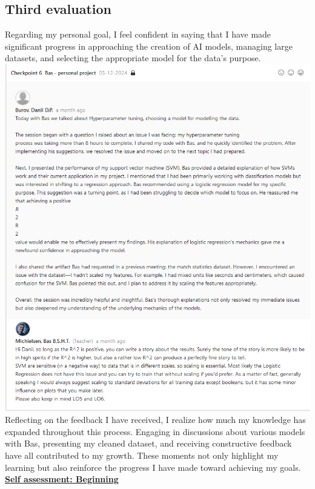 \documentclass{article}
\begin{document}
\subsection{Third evaluation}
Regarding my personal goal, I feel confident in saying that I have made significant progress in approaching the creation of AI models, managing large datasets, and selecting the appropriate model for the data's purpose.\\
\includegraphics[width=\textwidth,keepaspectratio]{images/Feedback_Bas_2.png}\\
Reflecting on the feedback I have received, I realize how much my knowledge has expanded throughout this process. Engaging in discussions about various models with Bas, presenting my cleaned dataset, and receiving constructive feedback have all contributed to my growth. These moments not only highlight my learning but also reinforce the progress I have made toward achieving my goals.\\
  \underline{\textbf{Self assessment: Beginning}}
\end{document}

